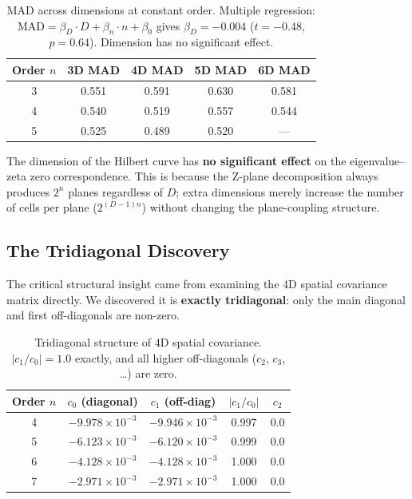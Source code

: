 \documentclass[11pt,a4paper]{article}
\begin{document}
\begin{table}[h]
\centering
\begin{tabular}{ccccc}
\toprule
Order $n$ & 3D MAD & 4D MAD & 5D MAD & 6D MAD \\
\midrule
3 & 0.551 & 0.591 & 0.630 & 0.581 \\
4 & 0.540 & 0.519 & 0.557 & 0.544 \\
5 & 0.525 & 0.489 & 0.520 & --- \\
\bottomrule
\end{tabular}
\caption{MAD across dimensions at constant order. Multiple regression:
$\text{MAD} = \beta_D \cdot D + \beta_n \cdot n + \beta_0$ gives
$\beta_D = -0.004$ ($t = -0.48$, $p = 0.64$). Dimension has no
significant effect.}
\label{tab:cross-dim}
\end{table}

The dimension of the Hilbert curve has \textbf{no significant effect} on the
eigenvalue--zeta zero correspondence. This is because the Z-plane
decomposition always produces $2^n$ planes regardless of $D$; extra
dimensions merely increase the number of cells per plane
($2^{(D-1)n}$) without changing the plane-coupling structure.

\subsection{The Tridiagonal Discovery}
\label{sec:tridiagonal}

The critical structural insight came from examining the 4D spatial
covariance matrix directly. We discovered it is \textbf{exactly
tridiagonal}: only the main diagonal and first off-diagonals are non-zero.

\begin{table}[h]
\centering
\begin{tabular}{ccccc}
\toprule
Order $n$ & $c_0$ (diagonal) & $c_1$ (off-diag) & $|c_1/c_0|$ & $c_2$ \\
\midrule
4 & $-9.978 \times 10^{-3}$ & $-9.946 \times 10^{-3}$ & 0.997 & 0.0 \\
5 & $-6.123 \times 10^{-3}$ & $-6.120 \times 10^{-3}$ & 0.999 & 0.0 \\
6 & $-4.128 \times 10^{-3}$ & $-4.128 \times 10^{-3}$ & 1.000 & 0.0 \\
7 & $-2.971 \times 10^{-3}$ & $-2.971 \times 10^{-3}$ & 1.000 & 0.0 \\
\bottomrule
\end{tabular}
\caption{Tridiagonal structure of 4D spatial covariance. $|c_1/c_0| = 1.0$
exactly, and all higher off-diagonals ($c_2$, $c_3$, \ldots) are zero.}
\label{tab:tridiag}
\end{table}
\end{document}
